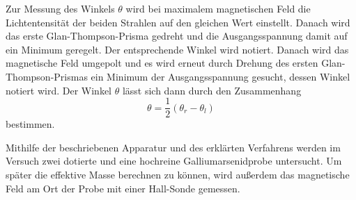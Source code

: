 Zur Messung des Winkels $\theta$ wird bei maximalem magnetischen Feld die Lichtentensität
der beiden Strahlen auf den gleichen Wert einstellt. Danach wird das erste Glan-Thompson-Prisma
gedreht und die Ausgangsspannung damit auf ein Minimum geregelt. Der entsprechende
Winkel wird notiert. Danach wird das magnetische Feld umgepolt und es wird erneut
durch Drehung des ersten Glan-Thompson-Prismas ein Minimum der Ausgangsspannung gesucht,
dessen Winkel notiert wird. Der Winkel $\theta$ lässt sich dann durch den Zusammenhang
\begin{equation}
  \theta  = \frac{1}{2} (\theta_r - \theta_l)
\label{eqn:drehwinkel}
\end{equation}
bestimmen.

Mithilfe der beschriebenen Apparatur und des erklärten Verfahrens werden im Versuch zwei dotierte
und eine hochreine Galliumarsenidprobe untersucht. Um später die effektive Masse berechnen zu
können, wird außerdem das magnetische Feld am Ort der Probe mit einer Hall-Sonde gemessen.
